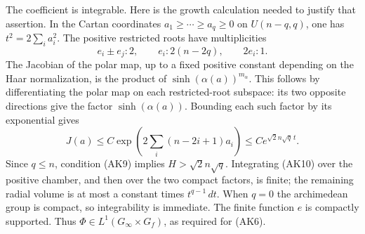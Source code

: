 The coefficient is integrable.  Here is the growth
calculation needed to justify that assertion.  In the
Cartan coordinates \(a_1\ge\cdots\ge a_q\ge0\) on
\(U(n-q,q)\), one has \(t^2=2\sum_i a_i^2\).
The positive restricted roots have multiplicities
\[
 e_i\pm e_j:2,\qquad e_i:2(n-2q),\qquad 2e_i:1.
\]
The Jacobian of the polar map, up to a fixed positive
constant depending on the Haar normalization, is
the product of \(\sinh(\alpha(a))^{m_\alpha}\).
This follows by differentiating the polar map on each
restricted-root subspace: its two opposite directions
give the factor \(\sinh(\alpha(a))\).
Bounding each such factor by its exponential gives
\[
 J(a)\le C\exp\left(2\sum_i(n-2i+1)a_i\right)
                                \le C e^{\sqrt2 n\sqrt q\,t}.
\]
Since \(q\le n\), condition (AK9) implies
\(H>\sqrt2 n\sqrt q\).  Integrating (AK10) over the
positive chamber, and then over the two compact factors,
is finite; the remaining radial volume is at most a
constant times \(t^{q-1}\,dt\).  When \(q=0\) the
archimedean group is compact, so integrability is immediate.
The finite function \(e\) is compactly supported.
Thus \(\Phi\in L^1(G_\infty\times G_f)\), as required
for (AK6).

